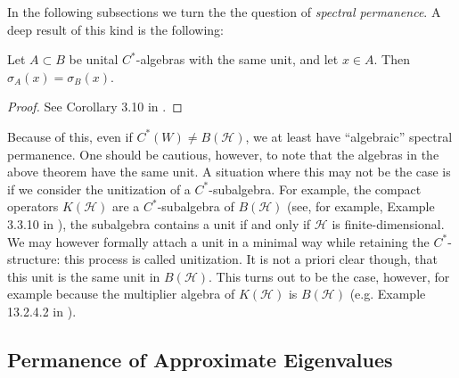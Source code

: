 \documentclass[12pt]{article}
\begin{document}
In the following subsections we turn the the question of \emph{spectral permanence}. A deep result of this kind is the following:

\begin{theorem}
	Let $A\subset B$ be unital $C^\ast$-algebras with the same unit, and let $x\in A$. Then $\sigma_A(x)=\sigma_B(x)$.
\end{theorem}
\begin{proof}
	See Corollary 3.10 in \cite{wilde_cstar}.
\end{proof}

\begin{remark}
	Because of this, even if $C^\ast(W)\neq B(\mathcal{H})$, we at least have ``algebraic'' spectral permanence. One should be cautious, however, to note that the algebras in the above theorem have the same unit. A situation where this may not be the case is if we consider the unitization of a $C^\ast$-subalgebra. For example, the compact operators $K(\mathcal{H})$ are a $C^\ast$-subalgebra of $B(\mathcal{H})$ (see, for example, Example 3.3.10 in \cite{wilde_cstar}), the subalgebra contains a unit if and only if $\mathcal{H}$ is finite-dimensional. We may however formally attach a unit in a minimal way while retaining the $C^\ast$-structure: this process is called unitization. It is not a priori clear though, that this unit is the same unit in $B(\mathcal{H})$. This turns out to be the case, however, for example because the multiplier algebra of $K(\mathcal{H})$ is $B(\mathcal{H})$ (e.g. Example 13.2.4.2 in \cite{farah_2019}).
\end{remark}


\subsection{Permanence of Approximate Eigenvalues} %
\end{document}
